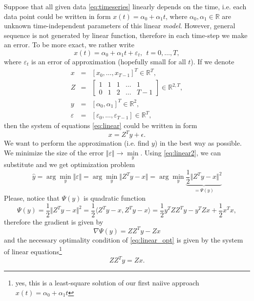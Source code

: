  Suppose that all given data \eqref{eq:timeseries} linearly depends on the time, i.e. each data point could be written in form $x(t) = \alpha_0 + \alpha_1 t$, where $\alpha_0,\alpha_1 \in \mathbb{R}$ are unknown time-independent parameters of this linear \emph{model}. 
 However, general sequence is not generated by linear function, therefore in each time-step we make an error. To be more exact, we rather write
 \begin{equation}
  \label{eq:linear}
  x(t) = \alpha_0 + \alpha_1 t + \varepsilon_t, ~~t = 0,\dots,T,
 \end{equation}
 where $\varepsilon_t$ is an error of approximation (hopefully small for all $t$). 
 If we denote 
 \begin{displaymath}
  \begin{array}{rcl}
   x & = & [x_0, \dots, x_{T-1}]^T \in \mathbb{R}^T, \\[5mm]
   Z & = & \left[
    \begin{array}{ccccc}
     1 & 1 & 1 & \dots & 1 \\
     0 & 1 & 2 & \dots & T-1
    \end{array} 
     \right] \in \mathbb{R}^{2,T}, \\[5mm]
   y & = & [\alpha_0,\alpha_1]^T \in \mathbb{R}^2, \\[5mm]
   \varepsilon & = & [\varepsilon_0,\dots,\varepsilon_{T-1}] \in \mathbb{R}^T,
  \end{array}
 \end{displaymath}
 then the system of equations \eqref{eq:linear} could be written in form
 \begin{equation}
  \label{eq:linear2}
  x = Z^T y + \epsilon.
 \end{equation}
 We want to perform the approximation (i.e. find $y$) in the best way as possible. We minimize the size of the error $\Vert \varepsilon \Vert \rightarrow \min\limits_{y}$. 
 Using \eqref{eq:linear2}, we can substitute and we get optimization problem
 \begin{equation}
  \label{eq:linear_opt}
  \hat{y} = \arg\min\limits_{y} \Vert \varepsilon \Vert  = \arg\min\limits_{y} \Vert Z^T y - x \Vert = \arg\min\limits_{y} \underbrace{\frac{1}{2}\Vert Z^T y - x \Vert^2}_{ = \Psi(y)}  
 \end{equation}
 Please, notice that $\Psi(y)$ is quadratic function
 \begin{displaymath}
  \Psi(y) = \frac{1}{2}\Vert Z^T y - x \Vert^2 = \frac{1}{2}\langle Z^T y - x, Z^T y - x \rangle = \frac{1}{2}y^T Z Z^T y - y^T Z x + \frac{1}{2}x^T x,
 \end{displaymath}
 therefore the gradient is given by
 \begin{displaymath}
  \nabla \Psi(y) = ZZ^T y - Z x
 \end{displaymath}
 and the necessary optimality condition of \eqref{eq:linear_opt} is given by the system of linear equations\footnote{yes, this is a least-square solution of our first naiive approach $x(t) = \alpha_0 + \alpha_1 t$}
 \begin{displaymath}
  ZZ^T y = Zx .
 \end{displaymath}

